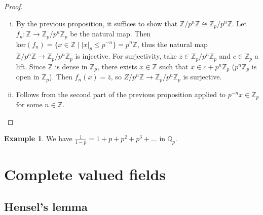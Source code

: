\documentclass{article}
\theoremstyle{definition}
\newtheorem{example}{Example}[section]
\begin{document}
\begin{proof}
    \begin{enumerate}[(i)]
        \item By the previous proposition, it suffices to show that $\mathbb{Z}/p^n\mathbb{Z} \cong \mathbb{Z}_p/p^n\mathbb{Z}$. Let $f_n : \mathbb{Z} \to \mathbb{Z}_p/p^n \mathbb{Z}_p$ be the natural map. Then $\text{ker}(f_n) =\{x \in \mathbb{Z} \mid |x|_p \le p^{-n}\} = p^n\mathbb{Z}$, thus the natural map $\mathbb{Z}/p^n\mathbb{Z} \to \mathbb{Z}_p/p^n \mathbb{Z}_p$ is injective. For surjectivity, take $\overline{z} \in \mathbb{Z}_p/p^n \mathbb{Z}_p$ and $c \in \mathbb{Z}_p$ a lift. Since $\mathbb{Z}$ is dense in $\mathbb{Z}_p$, there exists $x \in \mathbb{Z}$ such that $x \in c + p^n \mathbb{Z}_p$ ($p^n \mathbb{Z}_p$ is open in $\mathbb{Z}_p$). Then $f_n(x) = \overline{z}$, so $Z/p^n \mathbb{Z} \to \mathbb{Z}_p / p^n \mathbb{Z}_p$ is surjective.
        \item Follows from the second part of the previous proposition applied to $p^{-n} x \in \mathbb{Z}_p$ for some $n \in \mathbb{Z}$.
    \end{enumerate}
\end{proof}

\begin{example}
    We have $\frac{1}{1-p} = 1 + p + p^2 + p^3 + \ldots$ in $\mathbb{Q}_p$.
\end{example}

\section{Complete valued fields}

\subsection{Hensel's lemma}
\end{document}

